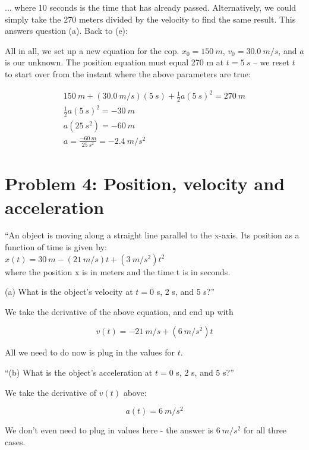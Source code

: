 \documentclass[12pt,a4paper]{report}
\begin{document}
... where 10 seconds is the time that has already passed. Alternatively, we could simply take the 270 meters divided by the velocity to find the same result. This answers question (a). Back to (e):

All in all, we set up a new equation for the cop. $x_0 = \SI{150}{m}$, $v_0 = \SI{30.0}{m/s}$, and $a$ is our unknown. The position equation must equal 270 m at $t = \SI{5}{s}$ -- we reset $t$ to start over from the instant where the above parameters are true:

\begin{align}
\SI{150}{m} + (\SI{30.0}{m/s})(\SI{5}{s}) + \frac{1}{2} a (\SI{5}{s})^2 = \SI{270}{m}\\
\frac{1}{2} a (\SI{5}{s})^2 = \SI{-30}{m}\\
a (\SI{25}{s^2}) = \SI{-60}{m}\\
a  = \frac{\SI{-60}{m}}{\SI{25}{s^2}} = \SI{-2.4}{m/s^2}
\end{align}

\section{Problem 4: Position, velocity and acceleration}

``An object is moving along a straight line parallel to the x-axis. Its position as a function of time is given by:\\
$x(t) = \SI{30}{m} - (\SI{21}{m/s}) t + (\SI{3}{m/s^2}) t^2$\\
where the position x is in meters and the time t is in seconds.

(a) What is the object's velocity at $t = 0$ s, 2 s, and 5 s?''

We take the derivative of the above equation, and end up with

\begin{equation}
v(t) = - \SI{21}{m/s} + (\SI{6}{m/s^2}) t
\end{equation}

All we need to do now is plug in the values for $t$.

``(b) What is the object's acceleration at $t = 0$ s, 2 s, and 5 s?''

We take the derivative of $v(t)$ above:

\begin{equation}
a(t) = \SI{6}{m/s^2}
\end{equation}

We don't even need to plug in values here - the answer is $\SI{6}{m/s^2}$ for all three cases.
\end{document}
